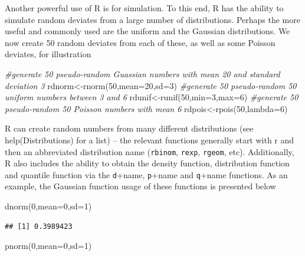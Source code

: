 \documentclass[
]{article}
\newenvironment{Shaded}{\begin{snugshade}}{\end{snugshade}}
\newcommand{\AttributeTok}[1]{\textcolor[rgb]{0.77,0.63,0.00}{#1}}
\newcommand{\CommentTok}[1]{\textcolor[rgb]{0.56,0.35,0.01}{\textit{#1}}}
\newcommand{\DecValTok}[1]{\textcolor[rgb]{0.00,0.00,0.81}{#1}}
\newcommand{\FunctionTok}[1]{\textcolor[rgb]{0.00,0.00,0.00}{#1}}
\newcommand{\NormalTok}[1]{#1}
\newcommand{\OtherTok}[1]{\textcolor[rgb]{0.56,0.35,0.01}{#1}}
\begin{document}
Another powerful use of R is for simulation. To this end, R has the
ability to simulate random deviates from a large number of
distributions. Perhaps the more useful and commonly used are the uniform
and the Gaussian distributions. We now create 50 random deviates from
each of these, as well as some Poisson deviates, for illustration

\begin{Shaded}
\begin{Highlighting}[]
\CommentTok{\#generate 50 pseudo{-}random Guassian numbers with mean 20 and standard deviation 3}
\NormalTok{rdnorm}\OtherTok{\textless{}{-}}\FunctionTok{rnorm}\NormalTok{(}\DecValTok{50}\NormalTok{,}\AttributeTok{mean=}\DecValTok{20}\NormalTok{,}\AttributeTok{sd=}\DecValTok{3}\NormalTok{)}
\CommentTok{\#generate 50 pseudo{-}random  50 uniform numbers between 3 and 6}
\NormalTok{rdunif}\OtherTok{\textless{}{-}}\FunctionTok{runif}\NormalTok{(}\DecValTok{50}\NormalTok{,}\AttributeTok{min=}\DecValTok{3}\NormalTok{,}\AttributeTok{max=}\DecValTok{6}\NormalTok{)}
\CommentTok{\#generate 50 pseudo{-}random  50 Poisson numbers with mean 6}
\NormalTok{rdpois}\OtherTok{\textless{}{-}}\FunctionTok{rpois}\NormalTok{(}\DecValTok{50}\NormalTok{,}\AttributeTok{lambda=}\DecValTok{6}\NormalTok{)}
\end{Highlighting}
\end{Shaded}

R can create random numbers from many different distributions (see
help(Distributions) for a list) -- the relevant functions generally
start with r and then an abbreviated distribution name (\texttt{rbinom},
\texttt{rexp}, \texttt{rgeom}, etc). Additionally, R also includes the
ability to obtain the density function, distribution function and
quantile function via the \texttt{d}+name, \texttt{p}+name and
\texttt{q}+name functions. As an example, the Gaussian function usage of
these functions is presented below

\begin{Shaded}
\begin{Highlighting}[]
\FunctionTok{dnorm}\NormalTok{(}\DecValTok{0}\NormalTok{,}\AttributeTok{mean=}\DecValTok{0}\NormalTok{,}\AttributeTok{sd=}\DecValTok{1}\NormalTok{)}
\end{Highlighting}
\end{Shaded}

\begin{verbatim}
## [1] 0.3989423
\end{verbatim}

\begin{Shaded}
\begin{Highlighting}[]
\FunctionTok{pnorm}\NormalTok{(}\DecValTok{0}\NormalTok{,}\AttributeTok{mean=}\DecValTok{0}\NormalTok{,}\AttributeTok{sd=}\DecValTok{1}\NormalTok{)}
\end{Highlighting}
\end{Shaded}
\end{document}
